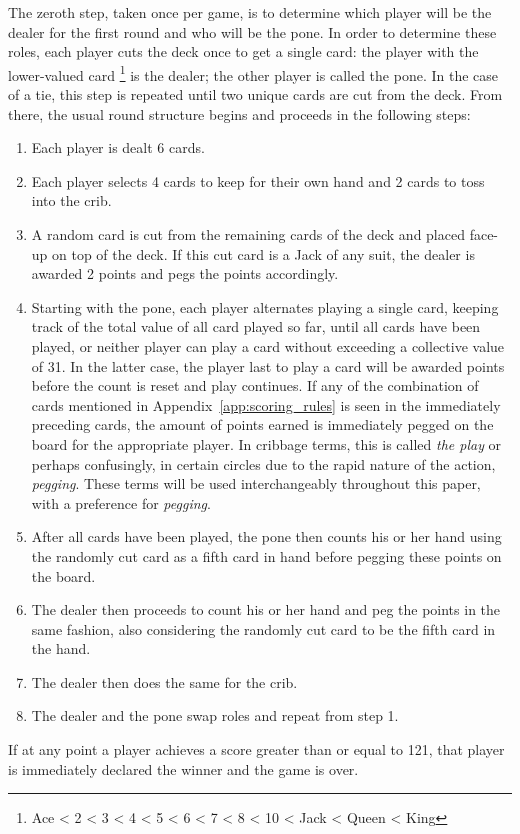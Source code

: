 The zeroth step, taken once per game, is to determine which player will be the
dealer for the first round and who will be the pone.
%
%
In order to determine these roles,
each player cuts the deck once to get a single card:
the player with the lower-valued card%
\footnote{Ace < 2 < 3 < 4 < 5 < 6 < 7 < 8 < 10 < Jack < Queen < King}
is the dealer;
the other player is called the pone.
In the case of a tie, this step is repeated until two unique cards are
cut from the deck.
%
From there, the usual round structure begins and proceeds in the following
steps:
%
\begin{enumerate}
%
\item Each player is dealt 6 cards.
%
\item Each player selects 4 cards to keep for their own hand and 2 cards to
	toss into the crib.
%
\item A random card is cut from the remaining cards of the deck and placed
	face-up on top of the deck.
	If this cut card is a Jack of any suit,
	the dealer is awarded 2 points and pegs the points accordingly.
%
\item Starting with the pone, each player alternates playing a single card,
	keeping track of the total value of all card played so far,
	until all cards have been played,
	or neither player can play a card without exceeding a collective value of
	31.
	In the latter case, the player last to play a card will be awarded points
	before the count is reset and play continues.
	If any of the combination of cards mentioned in
	Appendix~\ref{app:scoring_rules} is seen in the immediately preceding cards,
	the amount of points earned is immediately pegged on the board for the
	appropriate player.
	In cribbage terms, this is called \textit{the play}
	or perhaps confusingly,
	in certain circles due to the rapid nature of the
	action, \textit{pegging}.
	These terms will be used interchangeably throughout this paper,
	with a preference for \textit{pegging}.
%
\item After all cards have been played,
	the pone then counts his or her hand using the randomly cut card as a
	fifth card in hand before pegging these points on the board.
%
\item The dealer then proceeds to count his or her hand and peg the points
	in the same fashion, also considering the randomly cut card to be the
	fifth card in the hand.
%
\item The dealer then does the same for the crib.
%
\item The dealer and the pone swap roles and repeat from step 1.
%
\end{enumerate}
%
If at any point a player achieves a score greater than or equal to 121,
that player is immediately declared the winner and the game is over.


